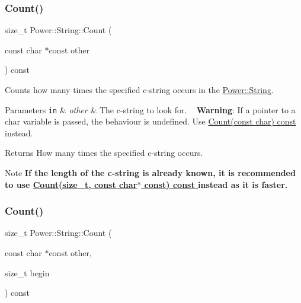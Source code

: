 \subsubsection{\texorpdfstring{Count()}{Count()}\hspace{0.1cm}{\footnotesize\ttfamily [4/12]}}
{\footnotesize\ttfamily size\+\_\+t Power\+::\+String\+::\+Count (\begin{DoxyParamCaption}\item[{const char $\ast$const}]{other }\end{DoxyParamCaption}) const\hspace{0.3cm}{\ttfamily [inline]}}



Counts how many times the specified c-\/string occurs in the \hyperlink{class_power_1_1_string}{Power\+::\+String}. 


\begin{DoxyParams}[1]{Parameters}
\mbox{\tt in}  & {\em other} & The c-\/string to look for. ~\newline
 {\bfseries Warning}\+: If a pointer to a char variable is passed, the behaviour is undefined. Use \hyperlink{class_power_1_1_string_a745ee4d411ec80fd085017573760bff2}{Count(const char) const }instead. \\
\hline
\end{DoxyParams}
\begin{DoxyReturn}{Returns}
How many times the specified c-\/string occurs. 
\end{DoxyReturn}
\begin{DoxyNote}{Note}
{\bfseries If the length of the c-\/string is already known, it is recommended to use \hyperlink{class_power_1_1_string_a2028976b7e5576e556a6dbb7e416d0f5}{Count(size\+\_\+t, const char$\ast$ const) const }instead as it is faster.} 
\end{DoxyNote}
\mbox{\label{class_power_1_1_string_ad49db0e9e51026e7814453c4d9ce9425}} 
\subsubsection{\texorpdfstring{Count()}{Count()}\hspace{0.1cm}{\footnotesize\ttfamily [5/12]}}
{\footnotesize\ttfamily size\+\_\+t Power\+::\+String\+::\+Count (\begin{DoxyParamCaption}\item[{const char $\ast$const}]{other,  }\item[{size\+\_\+t}]{begin }\end{DoxyParamCaption}) const\hspace{0.3cm}{\ttfamily [inline]}}



